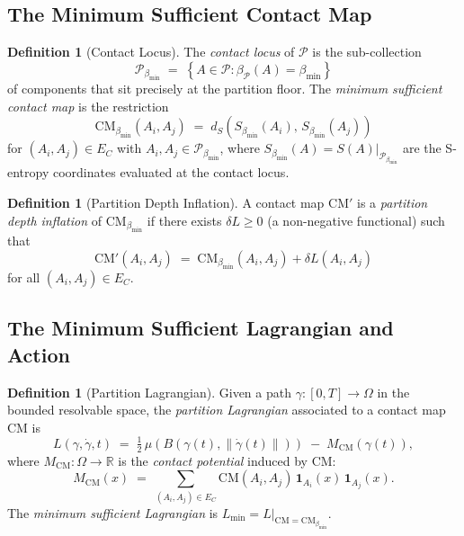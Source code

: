 \documentclass[12pt,a4paper,twocolumn]{article}
\theoremstyle{plain}
\theoremstyle{definition}
\newtheorem{definition}[theorem]{Definition}
\theoremstyle{remark}
\newcommand{\Part}{\mathcal{P}}
\newcommand{\CM}{\mathrm{CM}}
\newcommand{\bmin}{\beta_{\min}}
\newcommand{\bP}{\beta_{\mathcal{P}}}
\newcommand{\Scoord}{S}
\newcommand{\dS}{d_S}
\newcommand{\Lmin}{L_{\min}}
\newcommand{\CMbmin}{\CM_{\bmin}}
\newcommand{\Sbmin}{S_{\bmin}}
\newcommand{\Real}{\mathbb{R}}
\begin{document}
\subsection{The Minimum Sufficient Contact Map}

\begin{definition}[Contact Locus]
\label{def:contact-locus}
The \emph{contact locus} of $\Part$ is the sub-collection
\begin{equation}
  \Part_{\bmin} \;=\; \left\{ A \in \Part : \bP(A) = \bmin \right\}
\end{equation}
of components that sit precisely at the partition floor.  The
\emph{minimum sufficient contact map} is the restriction
\begin{equation}
  \CMbmin(A_i, A_j) \;=\; \dS\!\left(\Sbmin(A_i),\, \Sbmin(A_j)\right)
\end{equation}
for $(A_i, A_j) \in E_C$ with $A_i, A_j \in \Part_{\bmin}$, where
$\Sbmin(A) = \Scoord(A)|_{\Part_{\bmin}}$ are the S-entropy coordinates
evaluated at the contact locus.
\end{definition}

\begin{definition}[Partition Depth Inflation]
\label{def:inflation}
A contact map $\CM'$ is a \emph{partition depth inflation} of $\CMbmin$ if
there exists $\delta L \geq 0$ (a non-negative functional) such that
\begin{equation}
  \CM'(A_i, A_j) \;=\; \CMbmin(A_i, A_j) + \delta L(A_i, A_j)
\end{equation}
for all $(A_i, A_j) \in E_C$.
\end{definition}

\subsection{The Minimum Sufficient Lagrangian and Action}

\begin{definition}[Partition Lagrangian]
\label{def:lagrangian}
Given a path $\gamma : [0,T] \to \Omega$ in the bounded resolvable space,
the \emph{partition Lagrangian} associated to a contact map $\CM$ is
\begin{equation}
  L(\gamma, \dot\gamma, t) \;=\; \tfrac{1}{2}\,\mu\!\left(B(\gamma(t), \|\dot\gamma(t)\|)\right)
    \;-\; M_\CM(\gamma(t)),
\end{equation}
where $M_\CM : \Omega \to \Real$ is the \emph{contact potential} induced by
$\CM$:
\begin{equation}
  M_\CM(x) \;=\; \sum_{(A_i,A_j) \in E_C} \CM(A_i,A_j)\,
    \mathbf{1}_{A_i}(x)\,\mathbf{1}_{A_j}(x).
\end{equation}
The \emph{minimum sufficient Lagrangian} is $\Lmin = L|_{\CM = \CMbmin}$.
\end{definition}
\end{document}
